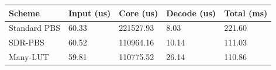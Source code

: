 \small
\setlength{\tabcolsep}{4pt}
\begin{tabular}{lllll}
\toprule
Scheme & Input (us) & Core (us) & Decode (us) & Total (ms) \\
\midrule
Standard PBS & 60.33 & 221527.93 & 8.03 & 221.60 \\
SDR-PBS & 60.52 & 110964.16 & 10.14 & 111.03 \\
Many-LUT & 59.81 & 110775.52 & 26.14 & 110.86 \\
\bottomrule
\end{tabular}

